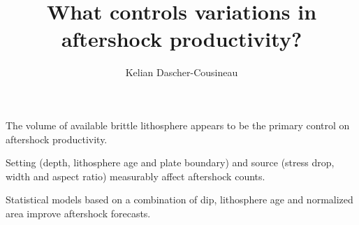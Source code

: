 \documentclass[draft, jgrga]{agujournal2018}
\author{Kelian Dascher-Cousineau}
\begin{document}
\large
\title{What controls variations in aftershock productivity?}











\begin{keypoints}
\item The volume of available brittle lithosphere appears to be the primary control on aftershock productivity.
\item Setting (depth, lithosphere age and plate boundary) and source (stress drop, width and aspect ratio) measurably affect aftershock counts.
\item Statistical models based on a combination of dip, lithosphere age and normalized area improve aftershock forecasts.
\end{keypoints}

\newpage
\end{document}
